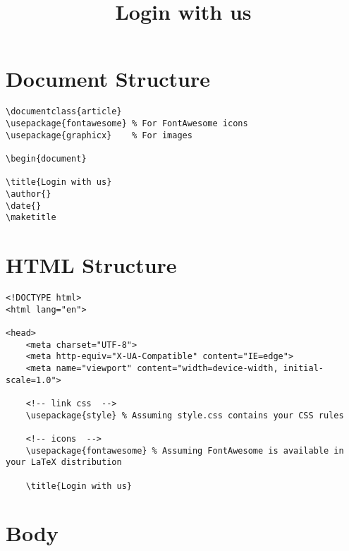 \documentclass{article}
\begin{document}
\title{Login with us}
\author{}
\date{}
\maketitle

\section*{Document Structure}

\begin{verbatim}
\documentclass{article}
\usepackage{fontawesome} % For FontAwesome icons
\usepackage{graphicx}    % For images

\begin{document}

\title{Login with us}
\author{}
\date{}
\maketitle
\end{verbatim}

\section*{HTML Structure}

\begin{verbatim}
<!DOCTYPE html>
<html lang="en">

<head>
    <meta charset="UTF-8">
    <meta http-equiv="X-UA-Compatible" content="IE=edge">
    <meta name="viewport" content="width=device-width, initial-scale=1.0">

    <!-- link css  -->
    \usepackage{style} % Assuming style.css contains your CSS rules

    <!-- icons  -->
    \usepackage{fontawesome} % Assuming FontAwesome is available in your LaTeX distribution

    \title{Login with us}
\end{verbatim}

\section*{Body}
\end{document}
